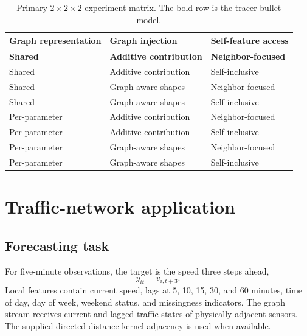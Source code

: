 \documentclass[11pt]{article}
\begin{document}
\begin{table}[t]
  \centering
  \caption{Primary $2\times2\times2$ experiment matrix. The bold row is the
  tracer-bullet model.}
  \label{tab:matrix}
  \begin{tabular}{lll}
    \toprule
    Graph representation & Graph injection & Self-feature access\\
    \midrule
    \textbf{Shared} & \textbf{Additive contribution} & \textbf{Neighbor-focused}\\
    Shared & Additive contribution & Self-inclusive\\
    Shared & Graph-aware shapes & Neighbor-focused\\
    Shared & Graph-aware shapes & Self-inclusive\\
    Per-parameter & Additive contribution & Neighbor-focused\\
    Per-parameter & Additive contribution & Self-inclusive\\
    Per-parameter & Graph-aware shapes & Neighbor-focused\\
    Per-parameter & Graph-aware shapes & Self-inclusive\\
    \bottomrule
  \end{tabular}
\end{table}

\section{Traffic-network application}
\label{sec:application}

\subsection{Forecasting task}

For five-minute observations, the target is the speed three steps ahead,
\begin{equation}
  y_{it}=v_{i,t+3}.
  \label{eq:traffic-target}
\end{equation}
Local features contain current speed, lags at 5, 10, 15, 30, and 60 minutes,
time of day, day of week, weekend status, and missingness indicators. The graph
stream receives current and lagged traffic states of physically adjacent
sensors. The supplied directed distance-kernel adjacency is used when available.
\end{document}
